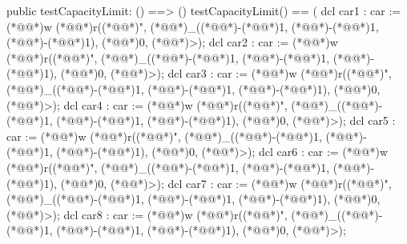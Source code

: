 \documentclass[a4paper]{article}
\begin{document}
\begin{vdm_al}
    public testCapacityLimit: () ==> ()
    testCapacityLimit() ==
    (
        dcl car1 : car := (*@@*)w (*@@*)r((*@@*)", (*@@*)_((*@\vdmnotcovered{}@*)-(*@\vdmnotcovered{}@*)1, (*@\vdmnotcovered{}@*)-(*@\vdmnotcovered{}@*)1, (*@\vdmnotcovered{}@*)-(*@\vdmnotcovered{}@*)1), (*@\vdmnotcovered{}@*)0, (*@@*)>);
        dcl car2 : car := (*@@*)w (*@@*)r((*@@*)", (*@@*)_((*@\vdmnotcovered{}@*)-(*@\vdmnotcovered{}@*)1, (*@\vdmnotcovered{}@*)-(*@\vdmnotcovered{}@*)1, (*@\vdmnotcovered{}@*)-(*@\vdmnotcovered{}@*)1), (*@\vdmnotcovered{}@*)0, (*@@*)>);
        dcl car3 : car := (*@@*)w (*@@*)r((*@@*)", (*@@*)_((*@\vdmnotcovered{}@*)-(*@\vdmnotcovered{}@*)1, (*@\vdmnotcovered{}@*)-(*@\vdmnotcovered{}@*)1, (*@\vdmnotcovered{}@*)-(*@\vdmnotcovered{}@*)1), (*@\vdmnotcovered{}@*)0, (*@@*)>);
        dcl car4 : car := (*@@*)w (*@@*)r((*@@*)", (*@@*)_((*@\vdmnotcovered{}@*)-(*@\vdmnotcovered{}@*)1, (*@\vdmnotcovered{}@*)-(*@\vdmnotcovered{}@*)1, (*@\vdmnotcovered{}@*)-(*@\vdmnotcovered{}@*)1), (*@\vdmnotcovered{}@*)0, (*@@*)>);
        dcl car5 : car := (*@@*)w (*@@*)r((*@@*)", (*@@*)_((*@\vdmnotcovered{}@*)-(*@\vdmnotcovered{}@*)1, (*@\vdmnotcovered{}@*)-(*@\vdmnotcovered{}@*)1, (*@\vdmnotcovered{}@*)-(*@\vdmnotcovered{}@*)1), (*@\vdmnotcovered{}@*)0, (*@@*)>);
        dcl car6 : car := (*@@*)w (*@@*)r((*@@*)", (*@@*)_((*@\vdmnotcovered{}@*)-(*@\vdmnotcovered{}@*)1, (*@\vdmnotcovered{}@*)-(*@\vdmnotcovered{}@*)1, (*@\vdmnotcovered{}@*)-(*@\vdmnotcovered{}@*)1), (*@\vdmnotcovered{}@*)0, (*@@*)>);
        dcl car7 : car := (*@@*)w (*@@*)r((*@@*)", (*@@*)_((*@\vdmnotcovered{}@*)-(*@\vdmnotcovered{}@*)1, (*@\vdmnotcovered{}@*)-(*@\vdmnotcovered{}@*)1, (*@\vdmnotcovered{}@*)-(*@\vdmnotcovered{}@*)1), (*@\vdmnotcovered{}@*)0, (*@@*)>);
        dcl car8 : car := (*@@*)w (*@@*)r((*@@*)", (*@@*)_((*@\vdmnotcovered{}@*)-(*@\vdmnotcovered{}@*)1, (*@\vdmnotcovered{}@*)-(*@\vdmnotcovered{}@*)1, (*@\vdmnotcovered{}@*)-(*@\vdmnotcovered{}@*)1), (*@\vdmnotcovered{}@*)0, (*@@*)>);
        


\end{vdm_al}
\end{document}

